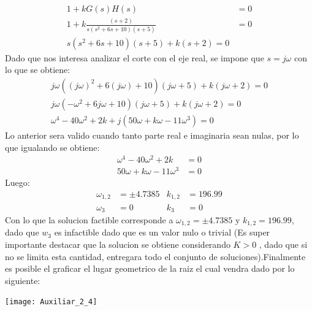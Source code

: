 \documentclass[
  11pt,
  letterpaper,
   addpoints,
  ]{exam}
\begin{document}
\begin{questions}
\begin{solution}
\begin{align}
    1+kG(s)H(s) &= 0\\
    1+k\frac{(s+2)}{s(s^{2}+6s+10)(s+5)} &= 0\\
    s(s^{2}+6s+10)(s+5)+k(s+2)=0
\end{align}
Dado que nos interesa analizar el corte con el eje real, se impone que $s=j\omega$ con lo que se obtiene:
\begin{align}
    j\omega((j\omega)^{2}+6(j\omega)+10)(j\omega+5)+k(j\omega+2)=0\\
    j\omega( -\omega^{2}+6j\omega+10)(j\omega+5)+k(j\omega+2)=0\\
    \omega^{4}-40\omega^{2}+2k + j(50\omega +k\omega-11\omega^{3})=0
\end{align}
Lo anterior sera valido cuando tanto parte real e imaginaria sean nulas, por lo que igualando se obtiene:
\begin{align}
    \omega^{4}-40\omega^{2}+2k &= 0\\
    50\omega +k\omega-11\omega^{3} &= 0
\end{align}
Luego:
\begin{align}
    \omega_{1,2} &= \pm 4.7385 & k_{1,2}&= 196.99\\
    \omega_{3} &= 0 & k_{3}&= 0
\end{align}
Con lo que la solucion factible corresponde a $\omega_{1,2} = \pm 4.7385$ y $k_{1,2}= 196.99$, dado que $w_{3}$ es infactible dado que es un valor nulo o trivial (Es super importante destacar que la solucion se obtiene considerando $K>0$ , dado que si no se limita esta cantidad, entregara todo el conjunto de soluciones).Finalmente es posible el graficar el lugar geometrico de la raiz el cual vendra dado por lo siguiente:
\begin{center}
    \texttt{[image: Auxiliar\_2\_4]}
  \end{center}

\end{solution}
\end{questions}
\end{document}
